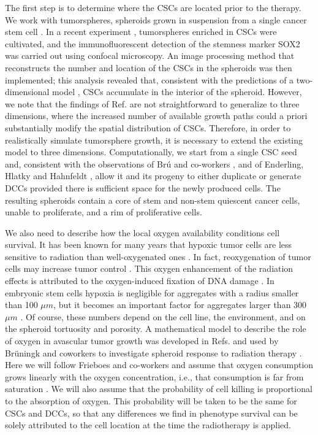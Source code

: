 \documentclass[10pt,letterpaper]{article}
\begin{document}
The first step is to determine where the CSCs are located prior to the therapy. We work with tumorspheres, spheroids grown in suspension from a single cancer stem cell  \cite{gu2011effect, chiodi2011drug,yang2013three, weiswald2015spherical, lee2016tumorsphere, benitez2019, benitez2021, barberis2021, Fotinos2023}. In a recent experiment \cite{fotinos2024}, tumorspheres enriched in CSCs were cultivated, and the immunofluorescent detection of the stemness marker SOX2 was carried out using confocal microscopy. An image processing method that reconstructs the number and location of the CSCs in the spheroids was then implemented; this analysis revealed that, consistent with the predictions of a two-dimensional model \cite{barberisRadialPercolationReveals2021}, CSCs accumulate in the interior of the spheroid. However, we note that the findings of Ref. \cite{barberisRadialPercolationReveals2021} are not straightforward to generalize to three dimensions, where the increased number of available growth paths could a priori substantially modify the spatial distribution of CSCs. Therefore, in order to realistically simulate tumorsphere growth, it is necessary to extend the existing model to three dimensions. Computationally, we start from a single CSC seed and, consistent with the observations of Brú and co-workers \cite{bru2003}, and of Enderling, Hlatky and Hahnfeldt \cite{enderling2009}, allow it and its progeny to either duplicate or generate DCCs provided there is sufficient space for the newly produced cells. The resulting spheroids contain a core of stem and non-stem quiescent cancer cells, unable to proliferate, and a rim of proliferative cells.

We also need to describe how the local oxygen availability conditions cell survival. It has been known for many years that hypoxic tumor cells are less sensitive to radiation than well-oxygenated ones \cite{grimes2016role}. In fact, reoxygenation of tumor cells may increase tumor control \cite{kim2005repopulation}. This oxygen enhancement of the radiation effects is attributed to the oxygen-induced fixation of DNA damage \cite{grimes2015mechanistic}. In embryonic stem cells hypoxia is negligible for aggregates with a radius smaller than 100 $\mu m$, but it becomes an important factor for aggregates larger than 300 $\mu m$ \cite{wu2014oxygen}. Of course, these numbers depend on the cell line, the environment, and on the spheroid tortuosity and porosity. A mathematical model to describe the role of oxygen in avascular tumor growth was developed in Refs. \cite{grimes2014method,grimes2015mechanistic} and used by Brüningk and coworkers to investigate spheroid response to radiation therapy \cite{bruningk2019}. Here we will follow Frieboes and co-workers and assume that oxygen consumption grows linearly with the oxygen concentration, i.e., that consumption is far from saturation \cite{frieboes2006}. We will also assume that the probability of cell killing is proportional to the absorption of oxygen. This probability will be taken to be the same for CSCs and DCCs, so that any differences we find in phenotype survival can be solely attributed to the cell location at the time the radiotherapy is applied.
\end{document}

